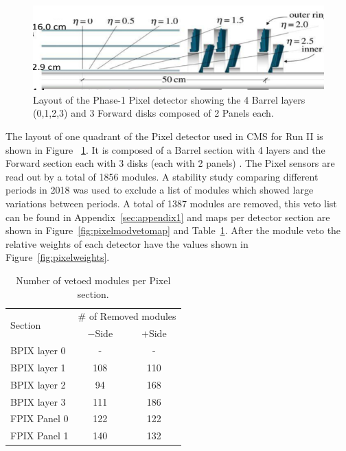 
\begin{figure}[t]
  \begin{center}
    \includegraphics[width=0.9\linewidth]{plots/PixLayout.png}
    \caption{
      Layout of the Phase-1 Pixel detector showing the 4 Barrel layers (0,1,2,3) and 3 Forward disks composed of 2 Panels each. 
    \label{fig:pixellayout}
    }
  \end{center}
\end{figure}


The layout of one quadrant of the Pixel detector used in CMS for  Run II is shown in Figure ~\ref{fig:pixellayout}.
It is composed of a Barrel section with 4 layers and the Forward section each with 3 disks (each with 2 panels) \cite{Collaboration_2008,tracking,pixeldet2017}.
The Pixel sensors are read out by a total of 1856 modules.
A stability study comparing different periods in 2018 was used to exclude a list of modules which showed large variations between periods.
A total of 1387 modules are removed, this veto list can be found in Appendix~\ref{sec:appendix1} and maps per detector section are shown in Figure~\ref{fig:pixelmodvetomap} and Table~\ref{tab:pixveto}.
After the module veto the relative weights of each detector have the values shown in Figure~\ref{fig:pixelweights}.

\begin{table}[hc]
\caption{Number of vetoed modules per Pixel section.}
\label{tab:pixveto}
\begin{center}
\begin{tabular}{l|c|c}
\hline
\multirow{2}{*}{Section} & \multicolumn{2}{c}{$\#$ of Removed modules}  \\
  & $-$Side & $+$Side \\
\hline
BPIX layer 0 & - & - \\
BPIX layer 1 & 108 & 110 \\
BPIX layer 2 & 94  & 168 \\
BPIX layer 3 & 111 & 186 \\
FPIX Panel 0 & 122 & 122 \\
FPIX Panel 1 & 140 & 132 \\
\hline\hline
\end{tabular}
\end{center}
\end{table}


